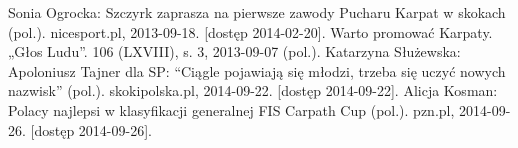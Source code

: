 \documentclass{beamer}
\begin{document}
\begin{thebibliography}{3}
 Sonia Ogrocka: Szczyrk zaprasza na pierwsze zawody Pucharu Karpat w skokach (pol.). nicesport.pl, 2013-09-18. [dostęp 2014-02-20].
\bibitem{} Warto promować Karpaty. „Głos Ludu”. 106 (LXVIII), s. 3, 2013-09-07 (pol.).
\bibitem{} Katarzyna Służewska: Apoloniusz Tajner dla SP: “Ciągle pojawiają się młodzi, trzeba się uczyć nowych nazwisk” (pol.). skokipolska.pl, 2014-09-22. [dostęp 2014-09-22].
 Alicja Kosman: Polacy najlepsi w klasyfikacji generalnej FIS Carpath Cup (pol.). pzn.pl, 2014-09-26. [dostęp 2014-09-26].

\end{thebibliography}
\end{document}
